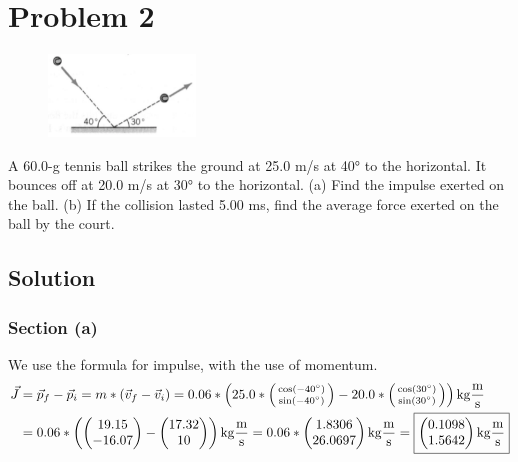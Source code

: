 \documentclass[12pt]{article}
\begin{document}
\pagebreak
\section*{Problem 2}
\begin{figure}
    \vspace{-30pt}
    \includegraphics[width=0.35\textwidth]{graph_2.png} 
\end{figure}
A 60.0-g tennis ball strikes the ground at 25.0 m/s at 40\unit{\degree} to the horizontal. It bounces off at 20.0 m/s at 30\unit{\degree} to the horizontal. (a) Find the impulse exerted on the ball. (b) If the collision lasted 5.00 ms, find the average force exerted on the ball by the court.

\subsection*{Solution}
\subsubsection*{Section (a)}
We use the formula for impulse, with the use of momentum.
\begin{align*}
    \vec{J} &=  \vec{p}_f - \vec{p}_i
        =   m*(\vec{v}_f - \vec{v}_i)
        =   0.06*\left( 25.0*\left(\begin{smallmatrix} \cos(-40\unit{\degree}) \\ \sin(-40\unit{\degree}) \end{smallmatrix}\right) - 20.0*\left(\begin{smallmatrix} \cos(30\unit{\degree}) \\ \sin(30\unit{\degree}) \end{smallmatrix}\right) \right) \unit{\kilo\gram\frac{\meter}{\second}}\\
        &=  0.06*\left( \begin{pmatrix} 19.15 \\ -16.07 \end{pmatrix} - \begin{pmatrix} 17.32 \\ 10 \end{pmatrix} \right) \unit{\kilo\gram\frac{\meter}{\second}}
        =   0.06*\begin{pmatrix} 1.8306 \\ 26.0697 \end{pmatrix} \unit{\kilo\gram\frac{\meter}{\second}}
        =   \boxed{ \begin{pmatrix} 0.1098 \\ 1.5642 \end{pmatrix} \unit{\kilo\gram\frac{\meter}{\second}} }
\end{align*}
\end{document}
